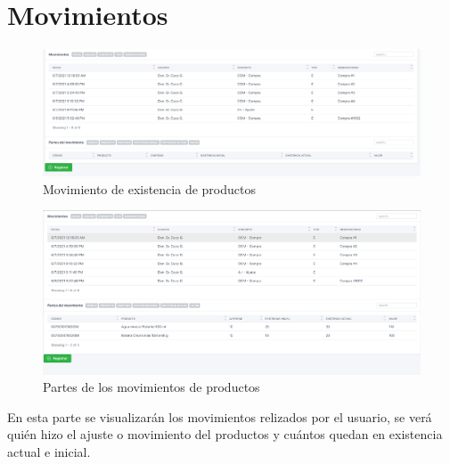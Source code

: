 \documentclass[a4paper,DIV=12]{scrreprt}
\begin{document}
\clearpage

	\section{Movimientos}
		\begin{figure}[h!]
		\centering
		\includegraphics[scale=0.4]{MOVIMIENTOS1.PNG}
		\caption{Movimiento de existencia de productos}
	\end{figure}
	
	
	
		\begin{figure}[h!]
		\centering
		\includegraphics[scale=0.4]{MOVIMIENTOS2.PNG}
		\caption{Partes de los movimientos de productos}
		\end{figure}
		
		 En esta parte se visualizarán los movimientos relizados por el usuario, se verá quién hizo el ajuste o movimiento del productos y cuántos quedan en existencia actual e inicial.


\end{document}
